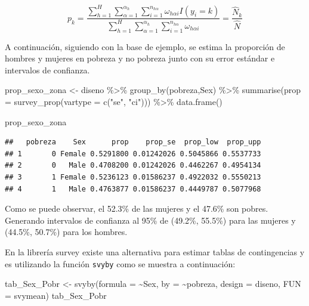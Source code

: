 \documentclass[
  12pt,
]{book}
\newenvironment{Shaded}{\begin{snugshade}}{\end{snugshade}}
\newcommand{\AttributeTok}[1]{\textcolor[rgb]{0.77,0.63,0.00}{#1}}
\newcommand{\FunctionTok}[1]{\textcolor[rgb]{0.00,0.00,0.00}{#1}}
\newcommand{\NormalTok}[1]{#1}
\newcommand{\OtherTok}[1]{\textcolor[rgb]{0.56,0.35,0.01}{#1}}
\newcommand{\SpecialCharTok}[1]{\textcolor[rgb]{0.00,0.00,0.00}{#1}}
\newcommand{\StringTok}[1]{\textcolor[rgb]{0.31,0.60,0.02}{#1}}
\begin{document}
\[
p_{k}  =  \frac{{\displaystyle \sum_{h=1}^{H}\sum_{\alpha=1}^{\alpha_{h}}\sum_{i=1}^{n_{h\alpha}}}\omega_{h\alpha i}I\left(y_{i}=k\right)}{{\displaystyle \sum_{h=1}^{H}\sum_{\alpha=1}^{\alpha_{h}}\sum_{i=1}^{n_{h\alpha}}}\omega_{h\alpha i}}
 =  \frac{\hat{N}_{k}}{\hat{N}}
\]

A continuación, siguiendo con la base de ejemplo, se estima la proporción de hombres y mujeres en pobreza y no pobreza junto con su error estándar e intervalos de confianza.

\begin{Shaded}
\begin{Highlighting}[]
\NormalTok{prop\_sexo\_zona }\OtherTok{\textless{}{-}}\NormalTok{ diseno }\SpecialCharTok{\%\textgreater{}\%} 
                  \FunctionTok{group\_by}\NormalTok{(pobreza,Sex) }\SpecialCharTok{\%\textgreater{}\%}
                  \FunctionTok{summarise}\NormalTok{(}\AttributeTok{prop =} \FunctionTok{survey\_prop}\NormalTok{(}\AttributeTok{vartype =} \FunctionTok{c}\NormalTok{(}\StringTok{"se"}\NormalTok{, }\StringTok{"ci"}\NormalTok{))) }\SpecialCharTok{\%\textgreater{}\%} 
                  \FunctionTok{data.frame}\NormalTok{()}

\NormalTok{prop\_sexo\_zona}
\end{Highlighting}
\end{Shaded}

\begin{verbatim}
##   pobreza    Sex      prop    prop_se  prop_low  prop_upp
## 1       0 Female 0.5291800 0.01242026 0.5045866 0.5537733
## 2       0   Male 0.4708200 0.01242026 0.4462267 0.4954134
## 3       1 Female 0.5236123 0.01586237 0.4922032 0.5550213
## 4       1   Male 0.4763877 0.01586237 0.4449787 0.5077968
\end{verbatim}

Como se puede observar, el 52.3\% de las mujeres y el 47.6\% son pobres. Generando intervalos de confianza al 95\% de (49.2\%, 55.5\%) para las mujeres y (44.5\%, 50.7\%) para los hombres.

En la librería survey existe una alternativa para estimar tablas de contingencias y es utilizando la función \texttt{svyby} como se muestra a continuación:

\begin{Shaded}
\begin{Highlighting}[]
\NormalTok{tab\_Sex\_Pobr }\OtherTok{\textless{}{-}} \FunctionTok{svyby}\NormalTok{(}\AttributeTok{formula =} \SpecialCharTok{\textasciitilde{}}\NormalTok{Sex, }\AttributeTok{by =}  \SpecialCharTok{\textasciitilde{}}\NormalTok{pobreza, }\AttributeTok{design =}\NormalTok{ diseno, }\AttributeTok{FUN =}\NormalTok{ svymean)}
\NormalTok{tab\_Sex\_Pobr}
\end{Highlighting}
\end{Shaded}
\end{document}
